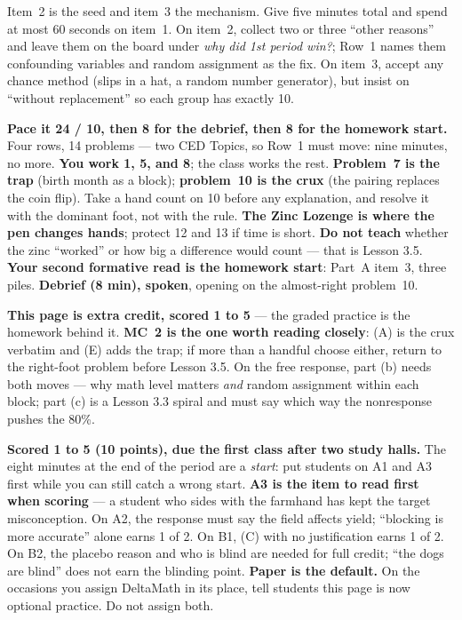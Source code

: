 \documentclass[10pt]{article}
\begin{document}
\begin{teachernote}[Warm-Up]
Item~2 is the seed and item~3 the mechanism. Give five minutes total and spend at most 60
seconds on item~1. On item~2, collect two or three ``other reasons'' and leave them on the
board under \emph{why did 1st period win?}; Row~1 names them confounding variables and
random assignment as the fix. On item~3, accept any chance method (slips in a hat, a random
number generator), but insist on ``without replacement'' so each group has exactly 10.
\end{teachernote}

\begin{teachernote}
\textbf{Pace it 24 / 10, then 8 for the debrief, then 8 for the homework start.} Four rows, 14
problems --- two CED Topics, so Row~1 must move: nine minutes, no more. \textbf{You work 1, 5,
and 8}; the class works the rest. \textbf{Problem~7 is the trap} (birth month as a block);
\textbf{problem~10 is the crux} (the pairing replaces the coin flip). Take a hand count on 10
before any explanation, and resolve it with the dominant foot, not with the rule. \textbf{The
Zinc Lozenge is where the pen changes hands}; protect 12 and 13 if time is short.
\textbf{Do not teach} whether the zinc ``worked'' or how big a difference would count --- that
is Lesson 3.5. \textbf{Your second formative read is the homework start}: Part~A item~3, three
piles. \textbf{Debrief (8 min), spoken}, opening on the almost-right problem~10.
\end{teachernote}

\begin{teachernote}[AP Practice]
\textbf{This page is extra credit, scored 1 to 5} --- the graded practice is the homework
behind it. \textbf{MC~2 is the one worth reading closely}: (A) is the crux verbatim and (E)
adds the trap; if more than a handful choose either, return to the right-foot problem before
Lesson 3.5. On the free response, part (b) needs both moves --- why math level matters
\emph{and} random assignment within each block; part (c) is a Lesson 3.3 spiral and must say
which way the nonresponse pushes the 80\%.
\end{teachernote}

\begin{teachernote}[Homework]
\textbf{Scored 1 to 5 (10 points), due the first class after two study halls.} The eight minutes at the
end of the period are a \emph{start}: put students on A1 and A3 first while you can still catch
a wrong start. \textbf{A3 is the item to read first when scoring} --- a student who sides with
the farmhand has kept the target misconception. On A2, the response must say the field affects
yield; ``blocking is more accurate'' alone earns 1 of 2. On B1, (C) with no justification earns
1 of 2. On B2, the placebo reason and who is blind are needed for full credit; ``the dogs are
blind'' does not earn the blinding point.
\textbf{Paper is the default.} On the occasions you assign DeltaMath in its place, tell
students this page is now optional practice. Do not assign
both.
\end{teachernote}
\end{document}
